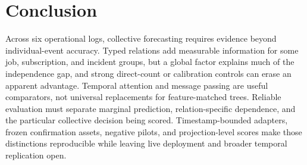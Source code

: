 \section{Conclusion}
Across six operational logs, collective forecasting requires evidence beyond
individual-event accuracy. Typed relations add measurable information for
some job, subscription, and incident groups, but a global factor explains much
of the independence gap, and strong direct-count or calibration controls can
erase an apparent advantage. Temporal attention and message passing are useful
comparators, not universal replacements for feature-matched trees. Reliable
evaluation must separate marginal prediction, relation-specific dependence,
and the particular collective decision being scored. Timestamp-bounded
adapters, frozen confirmation assets, negative pilots, and projection-level
scores make those distinctions reproducible while leaving live deployment
and broader temporal replication open.
